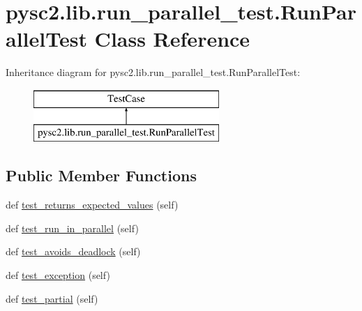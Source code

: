 \hypertarget{classpysc2_1_1lib_1_1run__parallel__test_1_1_run_parallel_test}{}\section{pysc2.\+lib.\+run\+\_\+parallel\+\_\+test.\+Run\+Parallel\+Test Class Reference}
\label{classpysc2_1_1lib_1_1run__parallel__test_1_1_run_parallel_test}
Inheritance diagram for pysc2.\+lib.\+run\+\_\+parallel\+\_\+test.\+Run\+Parallel\+Test\+:\begin{figure}[H]
\begin{center}
\leavevmode
\includegraphics[height=2.000000cm]{classpysc2_1_1lib_1_1run__parallel__test_1_1_run_parallel_test}
\end{center}
\end{figure}
\subsection*{Public Member Functions}
\begin{DoxyCompactItemize}
\item 
def \mbox{\hyperlink{classpysc2_1_1lib_1_1run__parallel__test_1_1_run_parallel_test_a9ee50abb779e56b37631c22327a4e496}{test\+\_\+returns\+\_\+expected\+\_\+values}} (self)
\item 
def \mbox{\hyperlink{classpysc2_1_1lib_1_1run__parallel__test_1_1_run_parallel_test_adb895ed2bebfa207517b06e8e7632776}{test\+\_\+run\+\_\+in\+\_\+parallel}} (self)
\item 
def \mbox{\hyperlink{classpysc2_1_1lib_1_1run__parallel__test_1_1_run_parallel_test_a2a0625445818f5ca5a8c4c2e9a4c87c5}{test\+\_\+avoids\+\_\+deadlock}} (self)
\item 
def \mbox{\hyperlink{classpysc2_1_1lib_1_1run__parallel__test_1_1_run_parallel_test_ade5a57fb5693870e414687c016641b9c}{test\+\_\+exception}} (self)
\item 
def \mbox{\hyperlink{classpysc2_1_1lib_1_1run__parallel__test_1_1_run_parallel_test_a951bb84a715106116dc66f1ee6691479}{test\+\_\+partial}} (self)
\end{DoxyCompactItemize}


